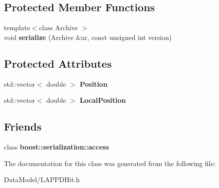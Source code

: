 \subsection*{Protected Member Functions}
\begin{DoxyCompactItemize}
\item 
\hypertarget{classLAPPDHit_af8eec8f466271e953f15dff64a172b26}{{\footnotesize template$<$class Archive $>$ }\\void {\bfseries serialize} (Archive \&ar, const unsigned int version)}\label{classLAPPDHit_af8eec8f466271e953f15dff64a172b26}

\end{DoxyCompactItemize}
\subsection*{Protected Attributes}
\begin{DoxyCompactItemize}
\item 
\hypertarget{classLAPPDHit_a979fc1e4b88cb77cac43c4dc3582ce3d}{std\-::vector$<$ double $>$ {\bfseries Position}}\label{classLAPPDHit_a979fc1e4b88cb77cac43c4dc3582ce3d}

\item 
\hypertarget{classLAPPDHit_a5517affe4e65ca692ce67160cd361d85}{std\-::vector$<$ double $>$ {\bfseries Local\-Position}}\label{classLAPPDHit_a5517affe4e65ca692ce67160cd361d85}

\end{DoxyCompactItemize}
\subsection*{Friends}
\begin{DoxyCompactItemize}
\item 
\hypertarget{classLAPPDHit_ac98d07dd8f7b70e16ccb9a01abf56b9c}{class {\bfseries boost\-::serialization\-::access}}\label{classLAPPDHit_ac98d07dd8f7b70e16ccb9a01abf56b9c}

\end{DoxyCompactItemize}


The documentation for this class was generated from the following file\-:\begin{DoxyCompactItemize}
\item 
Data\-Model/L\-A\-P\-P\-D\-Hit.\-h\end{DoxyCompactItemize}
